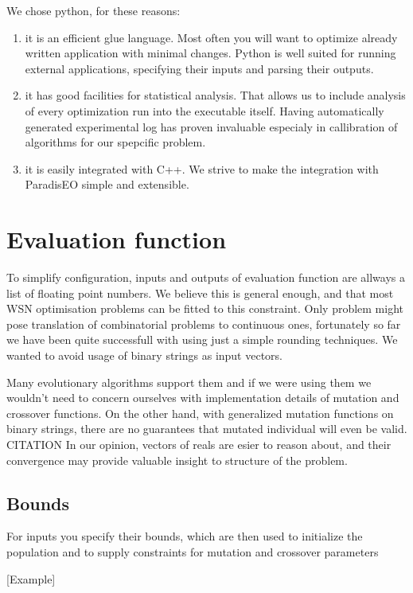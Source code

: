 \documentclass[12pt,oneside,draft]{fithesis2}
\begin{document}
We chose python, for these reasons:
\begin{enumerate}
\item it is an efficient glue language. 
Most often you will want to optimize already written application with minimal changes. Python is well suited for running external applications, specifying their inputs and parsing their outputs.
 
\item it has good facilities for statistical analysis.
That allows us to include analysis of every optimization run into the executable itself. Having automatically generated experimental log has proven invaluable especialy in callibration of algorithms for our spepcific problem.

\item it is easily integrated with C++.
We strive to make the integration with ParadisEO simple and extensible. 
\end{enumerate}
\section{Evaluation function}

To simplify configuration, inputs and outputs of evaluation function are allways a list of floating point numbers. We believe this is general enough, and that most WSN optimisation problems can be fitted to this constraint. Only problem might pose translation of combinatorial problems to continuous ones, fortunately so far we have been quite successfull with using just a simple rounding techniques. We wanted to avoid usage of binary strings as input vectors.

Many evolutionary algorithms support them and if we were using them we wouldn't need to concern ourselves with implementation details of mutation and crossover functions. On the other hand, with generalized mutation functions on binary strings, there are no guarantees that mutated individual will even be valid. CITATION In our opinion, vectors of reals are esier to reason about, and their convergence may provide valuable insight to structure of the problem.

\subsection{Bounds}
For inputs you specify their bounds, which are then used to initialize the population and to supply constraints for mutation and crossover parameters

[Example]
\end{document}
